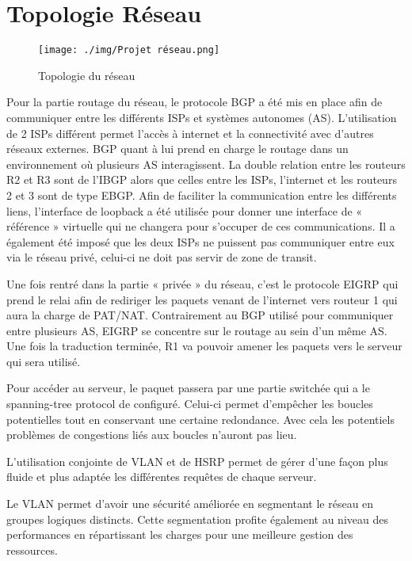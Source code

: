 \section{Topologie Réseau}

\begin{figure}[H]
    \centering
    \texttt{[image: ./img/Projet réseau.png]}
    \caption{Topologie du réseau}
    \label{fig:arnaud-topo}
\end{figure}

Pour la partie routage du réseau, le protocole BGP a été mis en place afin de communiquer
entre les différents ISPs et systèmes autonomes (AS). L'utilisation de 2 ISPs différent permet
l'accès à internet et la connectivité avec d'autres réseaux externes. BGP quant à lui prend en
charge le routage dans un environnement où plusieurs AS interagissent. La double relation
entre les routeurs R2 et R3 sont de l'IBGP alors que celles entre les ISPs, l'internet et les
routeurs 2 et 3 sont de type EBGP. Afin de faciliter la communication entre les différents liens,
l'interface de loopback a été utilisée pour donner une interface de « référence » virtuelle qui
ne changera pour s'occuper de ces communications. Il a également été imposé que les deux
ISPs ne puissent pas communiquer entre eux via le réseau privé, celui-ci ne doit pas servir de
zone de transit.

Une fois rentré dans la partie « privée » du réseau, c'est le protocole EIGRP qui prend le relai
afin de rediriger les paquets venant de l'internet vers routeur 1 qui aura la charge de PAT/NAT.
Contrairement au BGP utilisé pour communiquer entre plusieurs AS, EIGRP se concentre sur
le routage au sein d'un même AS. Une fois la traduction terminée, R1 va pouvoir amener les
paquets vers le serveur qui sera utilisé.

Pour accéder au serveur, le paquet passera par une partie switchée qui a le spanning-tree
protocol de configuré. Celui-ci permet d'empêcher les boucles potentielles tout en conservant
une certaine redondance. Avec cela les potentiels problèmes de congestions liés aux boucles
n'auront pas lieu.

L'utilisation conjointe de VLAN et de HSRP permet de gérer d'une façon plus fluide et plus
adaptée les différentes requêtes de chaque serveur.

Le VLAN permet d'avoir une sécurité améliorée en segmentant le réseau en groupes logiques
distincts. Cette segmentation profite également au niveau des performances en répartissant
les charges pour une meilleure gestion des ressources.

